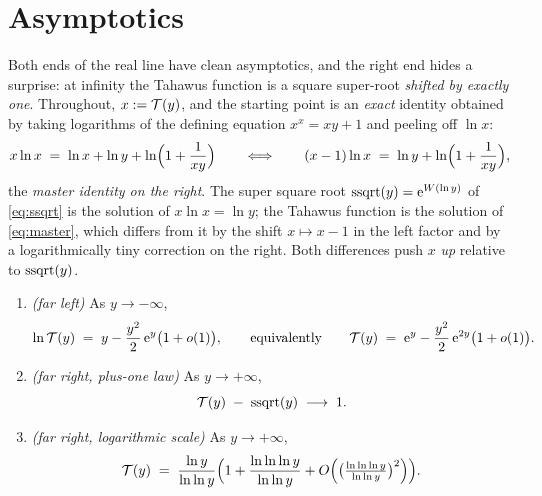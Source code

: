 \section{Asymptotics}\label{sec:asymptotics}

Both ends of the real line have clean asymptotics, and the right end
hides a surprise: at infinity the Tahawus function is a square
super-root \emph{shifted by exactly one}. Throughout, $x := \mathcal{T}(y)$,
and the starting point is an \emph{exact} identity obtained by taking
logarithms of the defining equation $x^{x} = xy + 1$ and peeling off
$\ln x$:
\begin{equation}\label{eq:master}
    x\ln x \;=\; \ln x + \ln y + \ln\Bigl(1 + \frac{1}{xy}\Bigr)
    \qquad\Longleftrightarrow\qquad
    (x - 1)\ln x \;=\; \ln y + \ln\Bigl(1 + \frac{1}{xy}\Bigr) ,
\end{equation}
the \emph{master identity on the right}. The super square root
$\operatorname{ssqrt}(y) = \mathrm{e}^{W(\ln y)}$ of \eqref{eq:ssqrt} is the solution of
$x\ln x = \ln y$; the Tahawus function is the solution of
\eqref{eq:master}, which differs from it by the shift $x \mapsto x-1$
in the left factor and by a logarithmically tiny correction on the
right. Both differences push $x$ \emph{up} relative to $\operatorname{ssqrt}(y)$.

\begin{theorem}[asymptotics]\label{thm:asymptotics}
\begin{enumerate}[label=\textup{(\roman*)}, leftmargin=2.4em]
\item \emph{(far left)} As $y \to -\infty$,
\begin{equation}\label{eq:asym-left}
    \ln \mathcal{T}(y) \;=\; y - \frac{y^{2}}{2}\,\mathrm{e}^{y}\bigl(1 + o(1)\bigr),
    \qquad\text{equivalently}\qquad
    \mathcal{T}(y) \;=\; \mathrm{e}^{y} - \frac{y^{2}}{2}\,\mathrm{e}^{2y}\bigl(1 + o(1)\bigr).
\end{equation}
\item \emph{(far right, plus-one law)} As $y \to +\infty$,
\begin{equation}\label{eq:asym-plusone}
    \mathcal{T}(y) \;-\; \operatorname{ssqrt}(y) \;\longrightarrow\; 1 .
\end{equation}
\item \emph{(far right, logarithmic scale)} As $y \to +\infty$,
\begin{equation}\label{eq:asym-right}
    \mathcal{T}(y) \;=\; \frac{\ln y}{\ln\ln y}
    \Bigl( 1 + \frac{\ln\ln\ln y}{\ln\ln y} +
    O\Bigl( \bigl(\tfrac{\ln\ln\ln y}{\ln\ln y}\bigr)^{2} \Bigr)
    \Bigr).
\end{equation}
\end{enumerate}
\end{theorem}

